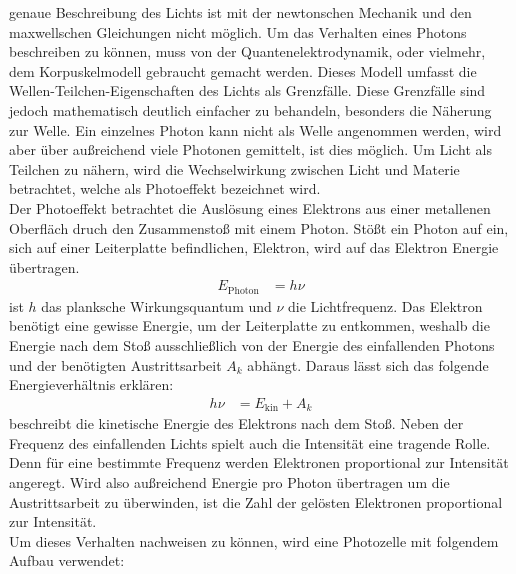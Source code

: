     \justifying genaue Beschreibung des Lichts ist mit der newtonschen Mechanik und den maxwellschen Gleichungen nicht möglich. Um das Verhalten eines Photons
    beschreiben zu können, muss von der Quantenelektrodynamik, oder vielmehr, dem Korpuskelmodell gebraucht gemacht werden. Dieses Modell umfasst die Wellen-Teilchen-Eigenschaften
    des Lichts als Grenzfälle. Diese Grenzfälle sind jedoch mathematisch deutlich einfacher zu behandeln, besonders die Näherung zur Welle. Ein einzelnes Photon kann nicht als
    Welle angenommen werden, wird aber über außreichend viele Photonen gemittelt, ist dies möglich. Um Licht als Teilchen zu nähern, wird die Wechselwirkung zwischen Licht und 
    Materie betrachtet, welche als Photoeffekt bezeichnet wird.\\
    Der Photoeffekt betrachtet die Auslösung eines Elektrons aus einer metallenen Oberfläch druch den Zusammenstoß mit einem Photon. Stößt ein Photon auf ein, sich auf einer 
    Leiterplatte befindlichen, Elektron, wird auf das Elektron Energie übertragen. \cite{V500}
    \begin{align}
        E_{\text{Photon}} &= h\nu \label{eq:1}
    \end{align} 
    \justifying ist $h$ das planksche Wirkungsquantum und $\nu$ die Lichtfrequenz. Das Elektron benötigt eine gewisse Energie, um der Leiterplatte zu entkommen, weshalb die Energie
    nach dem Stoß ausschließlich von der Energie des einfallenden Photons und der benötigten Austrittsarbeit $A_k$ abhängt. Daraus lässt sich das folgende Energieverhältnis
    erklären: \cite{V500}
    \begin{align}
        h\nu &= E_{\text{kin}} + A_k \label{eq:2}
    \end{align}
    \justifying beschreibt die kinetische Energie des Elektrons nach dem Stoß. Neben der Frequenz des einfallenden Lichts spielt auch die Intensität eine tragende Rolle. 
    Denn für eine bestimmte Frequenz werden Elektronen proportional zur Intensität angeregt. Wird also außreichend Energie pro Photon übertragen um die Austrittsarbeit zu 
    überwinden, ist die Zahl der gelösten Elektronen proportional zur Intensität.\\
    Um dieses Verhalten nachweisen zu können, wird eine Photozelle mit folgendem Aufbau verwendet:
